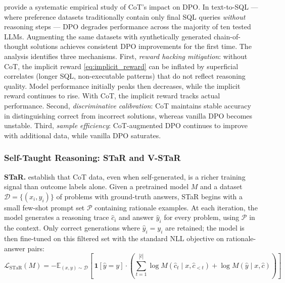 \documentclass[11pt]{article}
\begin{document}
\autocite{gao2025uncoveringimpactchainofthought} provide a systematic empirical study of CoT's impact on DPO. In text-to-SQL --- where preference datasets traditionally contain only final SQL queries \textit{without} reasoning steps --- DPO degrades performance across the majority of ten tested LLMs. Augmenting the same datasets with synthetically generated chain-of-thought solutions achieves consistent DPO improvements for the first time. The analysis identifies three mechanisms. First, \textit{reward hacking mitigation}: without CoT, the implicit reward \eqref{eq:implicit_reward} can be inflated by superficial correlates (longer SQL, non-executable patterns) that do not reflect reasoning quality. Model performance initially peaks then decreases, while the implicit reward continues to rise. With CoT, the implicit reward tracks actual performance. Second, \textit{discriminative calibration}: CoT maintains stable accuracy in distinguishing correct from incorrect solutions, whereas vanilla DPO becomes unstable. Third, \textit{sample efficiency}: CoT-augmented DPO continues to improve with additional data, while vanilla DPO saturates.

\subsubsection{Self-Taught Reasoning: STaR and V-STaR}

\textbf{STaR.} \autocite{zelikman2022starbootstrappingreasoningreasoning} establish that CoT data, even when self-generated, is a richer training signal than outcome labels alone. Given a pretrained model $M$ and a dataset $\mathcal{D} = \{(x_i, y_i)\}$ of problems with ground-truth answers, STaR begins with a small few-shot prompt set $\mathcal{P}$ containing rationale examples. At each iteration, the model generates a reasoning trace $\hat{c}_i$ and answer $\hat{y}_i$ for every problem, using $\mathcal{P}$ in the context. Only correct generations where $\hat{y}_i = y_i$ are retained; the model is then fine-tuned on this filtered set with the standard NLL objective on rationale-answer pairs:
\begin{equation}
    \mathcal{L}_{\text{STaR}}(M) = -\mathbb{E}_{(x,y) \sim \mathcal{D}} \left[\,\mathbf{1}[\hat{y} = y]\cdot \left(\sum_{t=1}^{|\hat{c}|} \log M(\hat{c}_t \mid x, \hat{c}_{<t}) + \log M(\hat{y} \mid x, \hat{c})\right)\right]
    \label{eq:star}
\end{equation}
\end{document}
